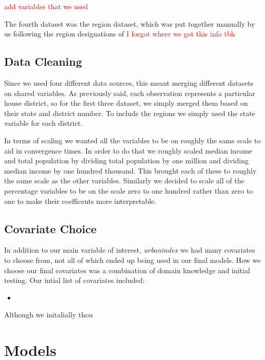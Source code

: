 \documentclass[12pt]{article}
\begin{document}
\textcolor{red}{add variables that we used}

The fourth dataset was the region dataset, which was put together manually by us following the region designations of \textcolor{red}{I forgot where we got this info tbh}

\subsection{Data Cleaning}

Since we used four different data sources, this meant merging different datasets on shared variables. As previously said, each observation represents a particular house district, so for the first three dataset, we simply merged them based on their state and district number. To include the regions we simply used the state variable for each district. 

In terms of scaling we wanted all the variables to be on roughly the same scale to aid in convergence times. In order to do that we roughly scaled median income and total population by dividing total population by one million and dividing median income by one hundred thousand. This brought each of these to roughly the same scale as the other variables. Similarly we decided to scale all of the percentage variables to be on the scale zero to one hundred rather than zero to one to make their coefficents more interpretable.  

\subsection{Covariate Choice}

In addition to our main variable of interest, \textit{urbanindex} we had many covariates to choose from, not all of which ended up being used in our final models. How we choose our final covariates was a combination of domain knowledge and initial testing. Our intial list of covariates included: 
\begin{itemize}
	\item 
\end{itemize}
Although we initalially thou


\section{Models}
\end{document}
